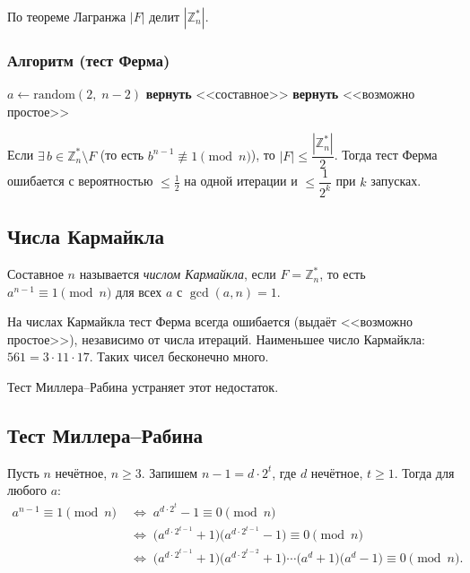 По теореме Лагранжа $|F|$ делит $|\mathbb{Z}_n^*|$.

\subsubsection*{Алгоритм (тест Ферма)}

\begin{algorithmic}
	\State $a \gets \mathrm{random}(2,\; n-2)$
	\State \textbf{вернуть} <<составное>>
	\Else
	\State \textbf{вернуть} <<возможно простое>>
	\EndIf
\end{algorithmic}

\begin{Corollary}{}{}
	Если $\exists\, b \in \mathbb{Z}_n^* \setminus F$ (то есть $b^{n-1} \not\equiv 1 \pmod{n}$), то $|F| \leq \dfrac{|\mathbb{Z}_n^*|}{2}$. Тогда тест Ферма ошибается с вероятностью $\leq \tfrac{1}{2}$ на одной итерации и $\leq \dfrac{1}{2^k}$ при $k$ запусках.
\end{Corollary}

\subsection{Числа Кармайкла}

\begin{Definition}{}{}
	Составное $n$ называется \emph{числом Кармайкла}, если $F = \mathbb{Z}_n^*$, то есть $a^{n-1} \equiv 1 \pmod{n}$ для всех $a$ с $\gcd(a,n)=1$.
\end{Definition}

\begin{Remark}{}{}
	На числах Кармайкла тест Ферма всегда ошибается (выдаёт <<возможно простое>>), независимо от числа итераций. Наименьшее число Кармайкла: $561 = 3 \cdot 11 \cdot 17$. Таких чисел бесконечно много.
\end{Remark}

Тест Миллера--Рабина устраняет этот недостаток.

\subsection{Тест Миллера--Рабина}

Пусть $n$ нечётное, $n \geq 3$. Запишем $n - 1 = d \cdot 2^t$, где $d$ нечётное, $t \geq 1$. Тогда для любого $a$:
\begin{align*}
	a^{n-1} \equiv 1 \pmod{n}
	&\;\Longleftrightarrow\; a^{d\cdot 2^t} - 1 \equiv 0 \pmod{n}\\
	&\;\Longleftrightarrow\; \bigl(a^{d\cdot 2^{t-1}}+1\bigr)\bigl(a^{d\cdot 2^{t-1}}-1\bigr) \equiv 0 \pmod{n}\\
	&\;\Longleftrightarrow\; \bigl(a^{d\cdot 2^{t-1}}+1\bigr)
	\bigl(a^{d\cdot 2^{t-2}}+1\bigr)
	\cdots
	\bigl(a^{d}+1\bigr)
	\bigl(a^{d}-1\bigr)
	\equiv 0 \pmod{n}.
\end{align*}

